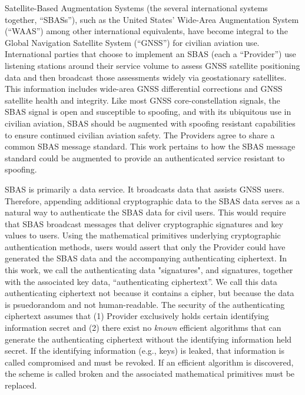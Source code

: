 \documentclass[letterpaper,times]{IONconf/IONconf}
\begin{document}
Satellite-Based Augmentation Systems (the several international systems together, ``SBASs''), such as the United States' Wide-Area Augmentation System (``WAAS'') among other international equivalents, have become integral to the Global Navigation Satellite System (``GNSS'') for civilian aviation use.
International parties that choose to implement an SBAS (each a ``Provider'') use listening stations around their service volume to assess GNSS satellite positioning data and then broadcast those assessments widely via geostationary satellites.
This information includes wide-area GNSS differential corrections and GNSS satellite health and integrity.
Like most GNSS core-constellation signals, the SBAS signal is open and susceptible to spoofing, and with its ubiquitous use in civilian aviation, SBAS should be augmented with spoofing resistant capabilities to ensure continued civilian aviation safety.
The Providers agree to share a common SBAS message standard.
This work pertains to how the SBAS message standard could be augmented to provide an authenticated service resistant to spoofing.

SBAS is primarily a data service.
It broadcasts data that assists GNSS users.
Therefore, appending additional cryptographic data to the SBAS data serves as a natural way to authenticate the SBAS data for civil users.
This would require that SBAS broadcast messages that deliver cryptographic signatures and key values to users.
Using the mathematical primitives underlying cryptographic authentication methods, users would assert that only the Provider could have generated the SBAS data and the accompanying authenticating ciphertext.
In this work, we call the authenticating data "signatures", and signatures, together with the associated key data, ``authenticating ciphertext''.
We call this data authenticating ciphertext not because it contains a cipher, but because the data is psuedorandom and not human-readable.
The security of the authenticating ciphertext assumes that (1) Provider exclusively holds certain identifying information secret and (2) there exist no {\em known} efficient algorithms that can generate the authenticating ciphertext without the identifying information held secret.
If the identifying information (e.g., keys) is leaked, that information is called compromised and must be revoked.
If an efficient algorithm is discovered, the scheme is called broken and the associated mathematical primitives must be replaced.
\end{document}
